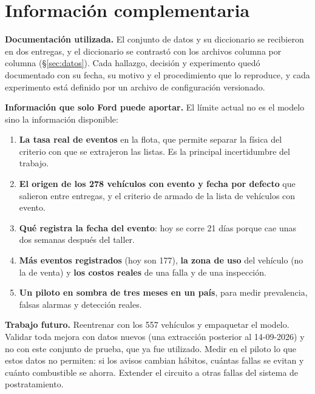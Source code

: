 \section{Información complementaria}
\label{sec:complementaria}

\textbf{Documentación utilizada.} El conjunto de datos y su diccionario se recibieron en dos entregas, y el diccionario se
contrastó con los archivos columna por columna (\S\ref{sec:datos}). Cada hallazgo, decisión y experimento quedó documentado
con su fecha, su motivo y el procedimiento que lo reproduce, y cada experimento está definido por un archivo de configuración
versionado.

\textbf{Información que solo Ford puede aportar.} El límite actual no es el modelo sino la información disponible:
\begin{enumerate}
  \item \textbf{La tasa real de eventos} en la flota, que permite separar la física del criterio con que se extrajeron las
    listas. Es la principal incertidumbre del trabajo.
  \item \textbf{El origen de los 278 vehículos con evento y fecha por defecto} que salieron entre entregas, y el criterio
    de armado de la lista de vehículos con evento.
  \item \textbf{Qué registra la fecha del evento}: hoy se corre 21 días porque cae unas dos semanas después del taller.
  \item \textbf{Más eventos registrados} (hoy son 177), \textbf{la zona de uso} del vehículo (no la de venta) y \textbf{los
    costos reales} de una falla y de una inspección.
  \item \textbf{Un piloto en sombra de tres meses en un país}, para medir prevalencia, falsas alarmas y detección reales.
\end{enumerate}

\textbf{Trabajo futuro.} Reentrenar con los 557 vehículos y empaquetar el modelo. Validar toda mejora con datos nuevos (una
extracción posterior al 14-09-2026) y no con este conjunto de prueba, que ya fue utilizado. Medir en el piloto lo que estos
datos no permiten: si los avisos cambian hábitos, cuántas fallas se evitan y cuánto combustible se ahorra. Extender el
circuito a otras fallas del sistema de postratamiento.

